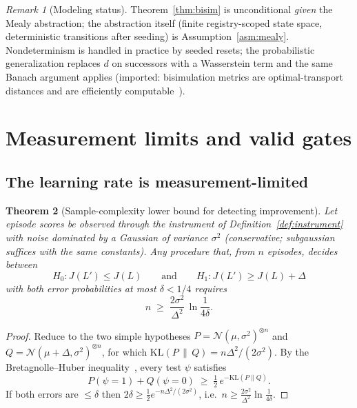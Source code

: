\documentclass[11pt]{article}
\theoremstyle{plain}
\newtheorem{theorem}{Theorem}[section]
\theoremstyle{definition}
\theoremstyle{remark}
\newtheorem{remark}[theorem]{Remark}
\newcommand{\KL}{\mathrm{KL}}
\begin{document}
\begin{remark}[Modeling status]
Theorem~\ref{thm:bisim} is unconditional \emph{given} the Mealy abstraction;
the abstraction itself (finite registry-scoped state space, deterministic
transitions after seeding) is Assumption~\ref{asm:mealy}. Nondeterminism is
handled in practice by seeded resets; the probabilistic generalization
replaces $d$ on successors with a Wasserstein term and the same Banach
argument applies (imported: bisimulation metrics are optimal-transport
distances and are efficiently computable~\cite{ot-bisim}).
\end{remark}

\section{Measurement limits and valid gates}\label{sec:measurement}

\subsection{The learning rate is measurement-limited}

\begin{theorem}[Sample-complexity lower bound for detecting improvement]
\label{thm:lowerbound}
Let episode scores be observed through the instrument of
Definition~\ref{def:instrument} with noise dominated by a Gaussian of
variance $\sigma^2$ (conservative; subgaussian suffices with the same
constants). Any procedure that, from $n$ episodes, decides between
\[
  H_0 : J(L') \le J(L)
  \qquad\text{and}\qquad
  H_1 : J(L') \ge J(L) + \Delta
\]
with both error probabilities at most $\delta < 1/4$ requires
\[
  n \;\ge\; \frac{2\sigma^2}{\Delta^2}\,\ln\!\frac{1}{4\delta}.
\]
\end{theorem}

\begin{proof}
Reduce to the two simple hypotheses $P = \mathcal N(\mu, \sigma^2)^{\otimes n}$
and $Q = \mathcal N(\mu + \Delta, \sigma^2)^{\otimes n}$, for which
$\KL(P \,\|\, Q) = n\Delta^2 / (2\sigma^2)$. By the Bretagnolle--Huber
inequality~\cite{bh79,tsybakov}, every test $\psi$ satisfies
\[
  P(\psi = 1) + Q(\psi = 0) \;\ge\; \tfrac12\, e^{-\KL(P \| Q)}.
\]
If both errors are $\le \delta$ then $2\delta \ge \frac12
e^{-n\Delta^2/(2\sigma^2)}$, i.e.\
$n \ge \frac{2\sigma^2}{\Delta^2} \ln \frac{1}{4\delta}$.
\end{proof}
\end{document}
